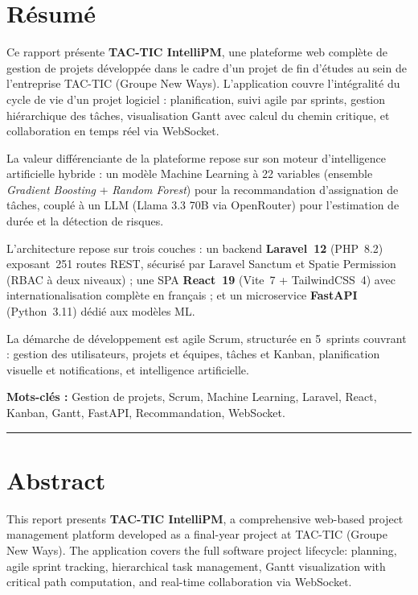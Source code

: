 \section*{Résumé}

Ce rapport présente \textbf{TAC-TIC IntelliPM}, une plateforme web complète de gestion
de projets développée dans le cadre d'un projet de fin d'études au sein de l'entreprise
TAC-TIC (Groupe New Ways). L'application couvre l'intégralité du cycle de vie d'un
projet logiciel : planification, suivi agile par sprints, gestion hiérarchique des tâches,
visualisation Gantt avec calcul du chemin critique, et collaboration en temps réel via
WebSocket.

La valeur différenciante de la plateforme repose sur son moteur d'intelligence
artificielle hybride : un modèle Machine Learning à 22 variables (ensemble
\textit{Gradient Boosting} + \textit{Random Forest}) pour la recommandation
d'assignation de tâches, couplé à un LLM (Llama 3.3 70B via OpenRouter) pour
l'estimation de durée et la détection de risques.

L'architecture repose sur trois couches : un backend \textbf{Laravel~12} (PHP~8.2)
exposant~251 routes REST, sécurisé par Laravel Sanctum et Spatie Permission (RBAC
à deux niveaux) ; une SPA \textbf{React~19} (Vite~7 + TailwindCSS~4) avec
internationalisation complète en français ; et un microservice \textbf{FastAPI}
(Python~3.11) dédié aux modèles ML.

La démarche de développement est agile Scrum, structurée en 5~sprints couvrant :
gestion des utilisateurs, projets et équipes, tâches et Kanban, planification visuelle
et notifications, et intelligence artificielle.

\vspace{0.5em}
\noindent\textbf{Mots-clés :} Gestion de projets, Scrum, Machine Learning, Laravel,
React, Kanban, Gantt, FastAPI, Recommandation, WebSocket.

\vspace{1.5em}
\rule{\linewidth}{0.3pt}

\section*{Abstract}

This report presents \textbf{TAC-TIC IntelliPM}, a comprehensive web-based project
management platform developed as a final-year project at TAC-TIC (Groupe New Ways).
The application covers the full software project lifecycle: planning, agile sprint
tracking, hierarchical task management, Gantt visualization with critical path
computation, and real-time collaboration via WebSocket.

